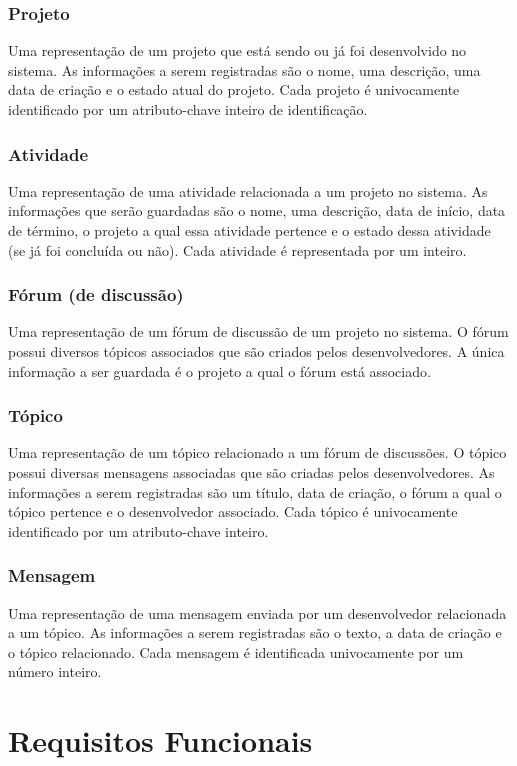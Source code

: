 \documentclass{article}
\begin{document}
		\subsubsection{Projeto}
		Uma representação de um projeto que está sendo ou já foi desenvolvido no sistema. As informações a serem registradas são o nome, uma descrição, uma data de criação e o estado atual do projeto. Cada projeto é univocamente identificado por um atributo-chave inteiro de identificação.

		\subsubsection{Atividade}
		Uma representação de uma atividade relacionada a um projeto no sistema. As informações que serão guardadas são o nome, uma descrição, data de início, data de término, o projeto a qual essa atividade pertence e o estado dessa atividade (se já foi concluída ou não). Cada atividade é representada por um inteiro.

		\subsubsection{Fórum (de discussão)}
		Uma representação de um fórum de discussão de um projeto no sistema. O fórum possui diversos tópicos associados que são criados pelos desenvolvedores. A única informação a ser guardada é o projeto a qual o fórum está associado.

		\subsubsection{Tópico}
		Uma representação de um tópico relacionado a um fórum de discussões. O tópico possui diversas mensagens associadas que são criadas pelos desenvolvedores. As informações a serem registradas são um título, data de criação, o fórum a qual o tópico pertence e o desenvolvedor associado. Cada tópico é univocamente identificado por um atributo-chave inteiro.

		\subsubsection{Mensagem}
		Uma representação de uma mensagem enviada por um desenvolvedor relacionada a um tópico. As informações a serem registradas são o texto, a data de criação e o tópico relacionado. Cada mensagem é identificada univocamente por um número inteiro.

\section{Requisitos Funcionais}
\end{document}
